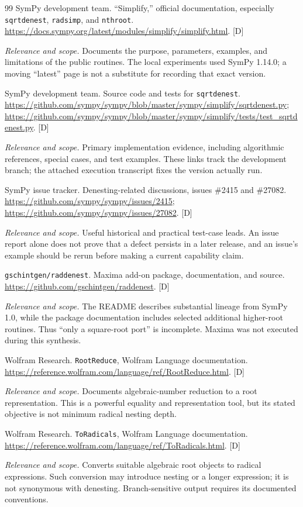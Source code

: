 \documentclass[11pt,letterpaper]{article}
\numberwithin{equation}{section}
\theoremstyle{definition}
\theoremstyle{remark}
\newcommand{\status}[1]{\textsf{\small[#1]}}
\newcommand{\entrynote}[1]{\par\smallskip\noindent\emph{Relevance and scope.} #1}
\begin{document}
\begin{thebibliography}{99}
SymPy development team. ``Simplify,'' official documentation, especially \texttt{sqrtdenest}, \texttt{radsimp}, and \texttt{nthroot}. \url{https://docs.sympy.org/latest/modules/simplify/simplify.html}. \status{D}
\entrynote{Documents the purpose, parameters, examples, and limitations of the public routines. The local experiments used SymPy 1.14.0; a moving ``latest'' page is not a substitute for recording that exact version.}

SymPy development team. Source code and tests for \texttt{sqrtdenest}. \url{https://github.com/sympy/sympy/blob/master/sympy/simplify/sqrtdenest.py}; \url{https://github.com/sympy/sympy/blob/master/sympy/simplify/tests/test_sqrtdenest.py}. \status{D}
\entrynote{Primary implementation evidence, including algorithmic references, special cases, and test examples. These links track the development branch; the attached execution transcript fixes the version actually run.}

SymPy issue tracker. Denesting-related discussions, issues \#2415 and \#27082. \url{https://github.com/sympy/sympy/issues/2415}; \url{https://github.com/sympy/sympy/issues/27082}. \status{D}
\entrynote{Useful historical and practical test-case leads. An issue report alone does not prove that a defect persists in a later release, and an issue's example should be rerun before making a current capability claim.}

\texttt{gschintgen/raddenest}. Maxima add-on package, documentation, and source. \url{https://github.com/gschintgen/raddenest}. \status{D}
\entrynote{The README describes substantial lineage from SymPy 1.0, while the package documentation includes selected additional higher-root routines. Thus ``only a square-root port'' is incomplete. Maxima was not executed during this synthesis.}

Wolfram Research. \texttt{RootReduce}, Wolfram Language documentation. \url{https://reference.wolfram.com/language/ref/RootReduce.html}. \status{D}
\entrynote{Documents algebraic-number reduction to a root representation. This is a powerful equality and representation tool, but its stated objective is not minimum radical nesting depth.}

Wolfram Research. \texttt{ToRadicals}, Wolfram Language documentation. \url{https://reference.wolfram.com/language/ref/ToRadicals.html}. \status{D}
\entrynote{Converts suitable algebraic root objects to radical expressions. Such conversion may introduce nesting or a longer expression; it is not synonymous with denesting. Branch-sensitive output requires its documented conventions.}


\end{thebibliography}
\end{document}
